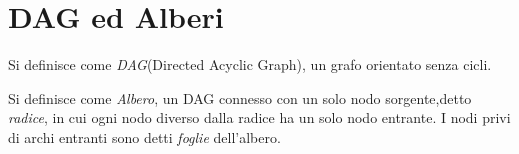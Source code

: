 \section{DAG ed Alberi}
Si definisce come \emph{DAG}(Directed Acyclic Graph), un grafo orientato senza cicli.

Si definisce come \emph{Albero}, un DAG connesso con un solo nodo sorgente,detto \emph{radice},
in cui ogni nodo diverso dalla radice ha un solo nodo entrante.\newline
I nodi privi di archi entranti sono detti \emph{foglie} dell'albero.




